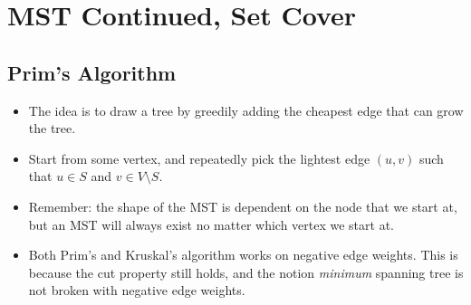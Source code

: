 \section{MST Continued, Set Cover}
	
	\subsection{Prim's Algorithm}
	\begin{itemize}
		\item The idea is to draw a tree by greedily adding the cheapest edge that can grow the tree.
		\item Start from some vertex, and repeatedly pick the lightest edge $(u, v)$ such that 
			$u \in S$ and $v \in V \setminus S$. 


		\item Remember: the shape of the MST is dependent on the node that we start at, but an MST will 
			always exist no matter which vertex we start at.  
		\item Both Prim's and Kruskal's algorithm works on negative edge weights. This is because the cut 
			property still holds, and the notion \textit{minimum} spanning tree is not broken with 
			negative edge weights.
	\end{itemize}

